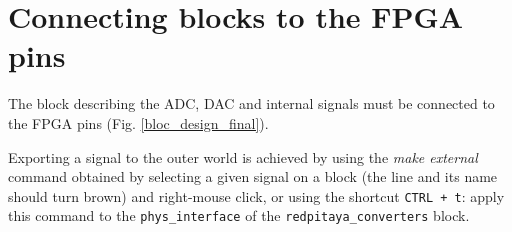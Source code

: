 \documentclass[10pt,oneside]{article}
\begin{document}
\section{Connecting blocks to the FPGA pins}

The block describing the ADC, DAC and internal signals must be connected
to the FPGA pins (Fig. \ref{bloc_design_final}).

Exporting a signal to the outer world is achieved by using the {\em make external} command
obtained by selecting a given signal on a block (the line and its name should turn brown) 
and right-mouse click, or using the shortcut {\tt CTRL + t}: apply this command to the
{\tt phys\_interface} of the {\tt redpitaya\_converters} block.

\end{document}
